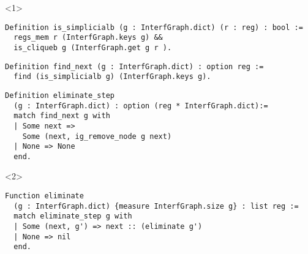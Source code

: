 

\begin{onlyenv}<1>
\begin{lstlisting}[style=Rocq]
Definition is_simplicialb (g : InterfGraph.dict) (r : reg) : bool :=
  regs_mem r (InterfGraph.keys g) &&
  is_cliqueb g (InterfGraph.get g r ).
\end{lstlisting}

\begin{lstlisting}[style=Rocq]
Definition find_next (g : InterfGraph.dict) : option reg :=
  find (is_simplicialb g) (InterfGraph.keys g).
\end{lstlisting}

\begin{lstlisting}[style=Rocq]
Definition eliminate_step
  (g : InterfGraph.dict) : option (reg * InterfGraph.dict):=
  match find_next g with
  | Some next =>
    Some (next, ig_remove_node g next)
  | None => None
  end.
\end{lstlisting}
\end{onlyenv}

\begin{onlyenv}<2>
\begin{lstlisting}[style=Rocq]
Function eliminate
  (g : InterfGraph.dict) {measure InterfGraph.size g} : list reg :=
  match eliminate_step g with
  | Some (next, g') => next :: (eliminate g')
  | None => nil
  end.
\end{lstlisting}
\end{onlyenv}